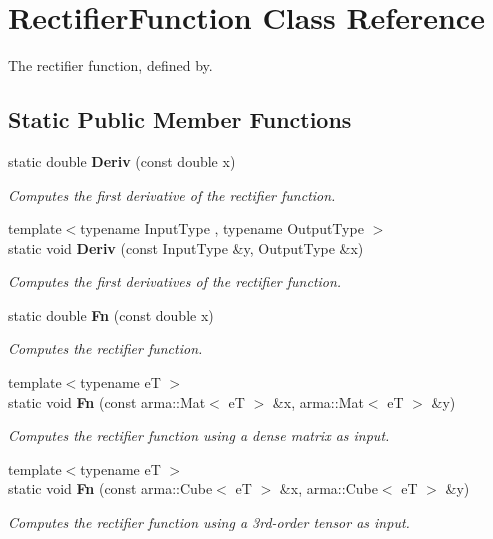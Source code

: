 \section{Rectifier\+Function Class Reference}
\label{classmlpack_1_1ann_1_1RectifierFunction}


The rectifier function, defined by.  


\subsection*{Static Public Member Functions}
\begin{DoxyCompactItemize}
\item 
static double \textbf{ Deriv} (const double x)
\begin{DoxyCompactList}\small\item\em Computes the first derivative of the rectifier function. \end{DoxyCompactList}\item 
{\footnotesize template$<$typename Input\+Type , typename Output\+Type $>$ }\\static void \textbf{ Deriv} (const Input\+Type \&y, Output\+Type \&x)
\begin{DoxyCompactList}\small\item\em Computes the first derivatives of the rectifier function. \end{DoxyCompactList}\item 
static double \textbf{ Fn} (const double x)
\begin{DoxyCompactList}\small\item\em Computes the rectifier function. \end{DoxyCompactList}\item 
{\footnotesize template$<$typename eT $>$ }\\static void \textbf{ Fn} (const arma\+::\+Mat$<$ eT $>$ \&x, arma\+::\+Mat$<$ eT $>$ \&y)
\begin{DoxyCompactList}\small\item\em Computes the rectifier function using a dense matrix as input. \end{DoxyCompactList}\item 
{\footnotesize template$<$typename eT $>$ }\\static void \textbf{ Fn} (const arma\+::\+Cube$<$ eT $>$ \&x, arma\+::\+Cube$<$ eT $>$ \&y)
\begin{DoxyCompactList}\small\item\em Computes the rectifier function using a 3rd-\/order tensor as input. \end{DoxyCompactList}\end{DoxyCompactItemize}


